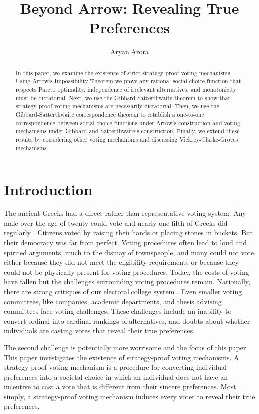\documentclass{amsart}
\title{Beyond Arrow: Revealing True Preferences}
\author{Aryan Arora}
\theoremstyle{plain}
\begin{document}
\maketitle

\begin{abstract}
    In this paper, we examine the existence of strict strategy-proof voting mechanisms. Using Arrow's Impossibility Theorem we prove any rational social choice function that respects Pareto optimality, independence of irrelevant alternatives, and monotonicity must be dictatorial. Next, we use the Gibbard-Satterthwaite theorem to show that strategy-proof voting mechanisms are necessarily dictatorial. Then, we use the Gibbard-Satterthwaite correspondence theorem to establish a one-to-one correspondence between social choice functions under Arrow's construction and voting mechanisms under Gibbard and Satterthwaite's construction. Finally, we extend these results by considering other voting mechanisms and discussing Vickrey-Clarke-Groves mechanisms.
\end{abstract}

\section{Introduction}

The ancient Greeks had a direct rather than representative voting system. Any male over the age of twenty could vote and nearly one-fifth of Greeks did regularly \cite{Greek}. Citizens voted by raising their hands or placing stones in buckets. But their democracy was far from perfect. Voting procedures often lead to loud and spirited arguments, much to the dismay of townspeople, and many could not vote either because they did not meet the eligibility requirements or because they could not be physically present for voting procedures. Today, the costs of voting have fallen but the challenges surrounding voting procedures remain. Nationally, there are strong critiques of our electoral college system \cite{ElectoralCollege}. Even smaller voting committees, like companies, academic departments, and thesis advising committees face voting challenges. These challenges include an inability to convert ordinal into cardinal rankings of alternatives, and doubts about whether individuals are casting votes that reveal their true preferences. 

The second challenge is potentially more worrisome and the focus of this paper. This paper investigates the existence of strategy-proof voting mechanisms. A strategy-proof voting mechanism is a procedure for converting individual preferences into a societal choice in which an individual does not have an incentive to cast a vote that is different from their sincere preferences. Most simply, a strategy-proof voting mechanism induces every voter to reveal their true preferences.
\end{document}
